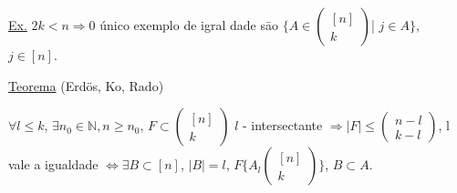 \documentclass[a4paper,12pt]{article}
\theoremstyle{plain} %
\theoremstyle{definition} %
\theoremstyle{remark} %
\begin{document}
	\normalsize
	\underline{Ex.} $2k<n\Rightarrow 0$ \'unico exemplo de igral dade s\=ao $\{A\in \left(\begin{smallmatrix}
		[n]\\
		k
	\end{smallmatrix}\right)$| $j\in A\}$, $j\in [n]$.
	\vspace{1ex}
	
	\underline{Teorema} (Erd\"os, Ko, Rado)
	
	$\forall l\leqslant k$, $\exists n_0\in \mathds{N}, n\geqslant n_0$, $F\subset \left(\begin{smallmatrix}
		[n]\\
		k
	\end{smallmatrix}\right)$ $l$ - intersectante $\Rightarrow |F|\leqslant \left(\begin{smallmatrix}
		n-l\\
		k-l
	\end{smallmatrix}\right)$, l vale a igualdade $\Leftrightarrow \exists B\subset[n]$, $|B|=l$, $F\{A_l \left(\begin{smallmatrix}
		[n]\\
		k
	\end{smallmatrix}\right)\}$, $B\subset A$.
	
\end{document}
